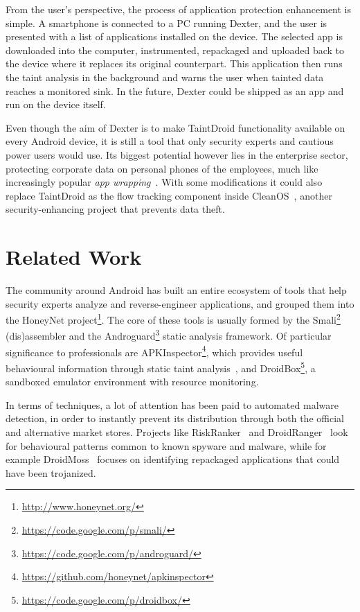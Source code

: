 \documentclass[12pt,twoside,notitlepage]{report}
\newcommand{\weblink}[1] {\footnote{\scriptsize\url{#1}}}
\begin{document}
From the user's perspective, the process of application protection enhancement is simple. A smartphone is connected to a PC running Dexter, and the user is presented with a list of applications installed on the device. The selected app is downloaded into the computer, instrumented, repackaged and uploaded back to the device where it replaces its original counterpart. This application then runs the taint analysis in the background and warns the user when tainted data reaches a monitored sink. In the future, Dexter could be shipped as an app and run on the device itself.

Even though the aim of Dexter is to make TaintDroid functionality available on every Android device, it is still a tool that only security experts and cautious power users would use. Its biggest potential however lies in the enterprise sector, protecting corporate data on personal phones of the employees, much like increasingly popular \emph{app wrapping}~\cite{web:AppWrapping}. With some modifications it could also replace TaintDroid as the flow tracking component inside CleanOS~\cite{Tang:2012:CLM:2387880.2387888}, another security-enhancing project that prevents data theft.

\section{Related Work}

The community around Android has built an entire ecosystem of tools that help security experts analyze and reverse-engineer applications, and grouped them into the HoneyNet project\weblink{http://www.honeynet.org/}. The core of these tools is usually formed by the Smali\weblink{https://code.google.com/p/smali/} (dis)assembler and the Androguard\weblink{https://code.google.com/p/androguard/} static analysis framework. Of particular significance to professionals are APKInspector\weblink{https://github.com/honeynet/apkinspector}, which provides useful behavioural information through static taint analysis~\cite{2012kim_scandal}, and DroidBox\weblink{https://code.google.com/p/droidbox/}, a sandboxed emulator environment with resource monitoring. 

In terms of techniques, a lot of attention has been paid to automated malware detection, in order to instantly prevent its distribution through both the official and alternative market stores. Projects like RiskRanker~\cite{Grace:2012:RSA:2307636.2307663} and DroidRanger~\cite{Yajin:12NDSS} look for behavioural patterns common to known spyware and malware, while for example DroidMoss~\cite{Zhou:2012:DRS:2133601.2133640} focuses on identifying repackaged applications that could have been trojanized. 
\end{document}
